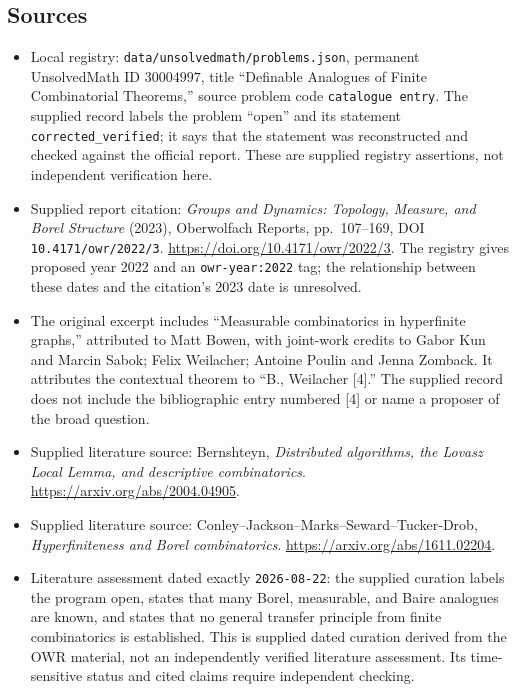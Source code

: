 \documentclass[11pt]{article}
\begin{document}
\subsection{Sources}
\begin{itemize}
\item Local registry: \texttt{data/unsolvedmath/problems.json}, permanent UnsolvedMath ID \(30004997\), title ``Definable Analogues of Finite Combinatorial Theorems,'' source problem code \texttt{catalogue entry}. The supplied record labels the problem ``open'' and its statement \texttt{corrected\_verified}; it says that the statement was reconstructed and checked against the official report. These are supplied registry assertions, not independent verification here.
\item Supplied report citation: \emph{Groups and Dynamics: Topology, Measure, and Borel Structure} (2023), Oberwolfach Reports, pp.\ 107--169, DOI \texttt{10.4171/owr/2022/3}. \url{https://doi.org/10.4171/owr/2022/3}. The registry gives proposed year 2022 and an \texttt{owr-year:2022} tag; the relationship between these dates and the citation's 2023 date is unresolved.
\item The original excerpt includes ``Measurable combinatorics in hyperfinite graphs,'' attributed to Matt Bowen, with joint-work credits to Gabor Kun and Marcin Sabok; Felix Weilacher; Antoine Poulin and Jenna Zomback. It attributes the contextual theorem to ``B., Weilacher [4].'' The supplied record does not include the bibliographic entry numbered [4] or name a proposer of the broad question.
\item Supplied literature source: Bernshteyn, \emph{Distributed algorithms, the Lovasz Local Lemma, and descriptive combinatorics}. \url{https://arxiv.org/abs/2004.04905}.
\item Supplied literature source: Conley--Jackson--Marks--Seward--Tucker-Drob, \emph{Hyperfiniteness and Borel combinatorics}. \url{https://arxiv.org/abs/1611.02204}.
\item Literature assessment dated exactly \texttt{2026-08-22}: the supplied curation labels the program open, states that many Borel, measurable, and Baire analogues are known, and states that no general transfer principle from finite combinatorics is established. This is supplied dated curation derived from the OWR material, not an independently verified literature assessment. Its time-sensitive status and cited claims require independent checking.
\end{itemize}
\end{document}

